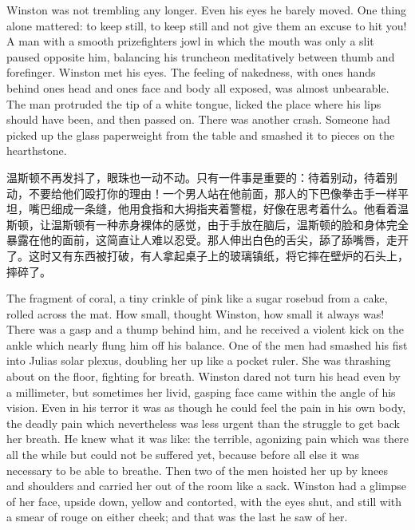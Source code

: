 \begin{paracol}{2}
\switchcolumn*

Winston was not trembling any longer. Even his eyes he barely moved. One
thing alone mattered: to keep still, to keep still and not give them an
excuse to hit you! A man with a smooth prizefighter\textquotesingle s
jowl in which the mouth was only a slit paused opposite him, balancing
his truncheon meditatively between thumb and forefinger. Winston met his
eyes. The feeling of nakedness, with one\textquotesingle s hands behind
one\textquotesingle s head and one\textquotesingle s face and body all
exposed, was almost unbearable. The man protruded the tip of a white
tongue, licked the place where his lips should have been, and then
passed on. There was another crash. Someone had picked up the glass
paperweight from the table and smashed it to pieces on the hearthstone.

\switchcolumn

温斯顿不再发抖了，眼珠也一动不动。只有一件事是重要的：待着别动，待着别动，不要给他们殴打你的理由！一个男人站在他前面，那人的下巴像拳击手一样平坦，嘴巴细成一条缝，他用食指和大拇指夹着警棍，好像在思考着什么。他看着温斯顿，让温斯顿有一种赤身裸体的感觉，由于手放在脑后，温斯顿的脸和身体完全暴露在他的面前，这简直让人难以忍受。那人伸出白色的舌尖，舔了舔嘴唇，走开了。这时又有东西被打破，有人拿起桌子上的玻璃镇纸，将它摔在壁炉的石头上，摔碎了。

\switchcolumn*

The fragment of coral, a tiny crinkle of pink like a sugar rosebud from
a cake, rolled across the mat. How small, thought Winston, how small it
always was! There was a gasp and a thump behind him, and he received a
violent kick on the ankle which nearly flung him off his balance. One of
the men had smashed his fist into Julia\textquotesingle s solar plexus,
doubling her up like a pocket ruler. She was thrashing about on the
floor, fighting for breath. Winston dared not turn his head even by a
millimeter, but sometimes her livid, gasping face came within the angle
of his vision. Even in his terror it was as though he could feel the
pain in his own body, the deadly pain which nevertheless was less urgent
than the struggle to get back her breath. He knew what it was like: the
terrible, agonizing pain which was there all the while but could not be
suffered yet, because before all else it was necessary to be able to
breathe. Then two of the men hoisted her up by knees and shoulders and
carried her out of the room like a sack. Winston had a glimpse of her
face, upside down, yellow and contorted, with the eyes shut, and still
with a smear of rouge on either cheek; and that was the last he saw of
her.


\end{paracol}
